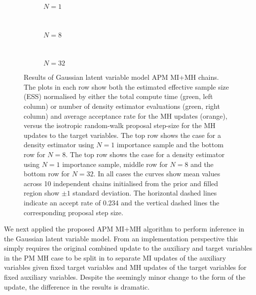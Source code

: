 \begin{figure}
\centering
\begin{subfigure}[b]{\linewidth}
\centering
  \caption{$N=1$}
  \label{sfig:apm-mi-mh-1-gaussian-latent}
\end{subfigure}
\\[3mm]
\begin{subfigure}[b]{\linewidth}
\centering
  \caption{$N=8$}
  \label{sfig:apm-mi-mh-8-gaussian-latent}
\end{subfigure}
\\[3mm]
\begin{subfigure}[b]{\linewidth}
\centering
  \caption{$N=32$}
  \label{sfig:apm-mi-mh-32-gaussian-latent}
\end{subfigure}
\caption[\acs{APM} \acs{MI}+\acs{MH} Gaussian model results.]{
Results of Gaussian latent variable model \acs{APM} \acs{MI}+\acs{MH} chains. The plots in each row show both the estimated effective sample size (ESS) normalised by either the total compute time (green, left column) or number of density estimator evaluations (green, right column) and average acceptance rate for the \ac{MH} updates (orange), versus the isotropic random-walk proposal step-size for the \ac{MH} updates to the target variables. The top row shows the case for a density estimator using $N=1$ importance sample and the bottom row for $N=8$. The top row shows the case for a density estimator using $N=1$ importance sample, middle row for $N=8$ and the bottom row for $N=32$. In all cases the curves show mean values across 10 independent chains initialised from the prior and filled region show $\pm 1$ standard deviation. The horizontal dashed lines indicate an accept rate of 0.234 and the vertical dashed lines the corresponding proposal step size.}
\label{fig:apm-mi-mh-gaussian-latent-results}
\end{figure}

We next applied the proposed \ac{APM} \ac{MI}+\ac{MH} algorithm to perform inference in the Gaussian latent variable model. From an implementation perspective this simply requires the original combined update to the auxiliary and target variables in the \ac{PM} \ac{MH} case to be split in to separate \ac{MI} updates of the auxiliary variables given fixed target variables and \ac{MH} updates of the target variables for fixed auxiliary variables. Despite the seemingly minor change to the form of the update, the difference in the results is dramatic.

